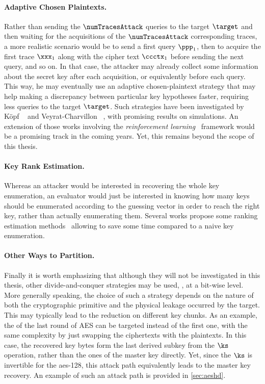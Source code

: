 \paragraph{Adaptive Chosen Plaintexts.}
Rather than sending the \(\numTracesAttack\) queries to the target \(\target\) and then waiting for the acquisitions of the \(\numTracesAttack\) corresponding traces, a more realistic scenario would be to send a first query \(\ppp_1\), then to acquire the first trace \(\xxx_1\) along with the cipher text \(\ccctx_1\) before sending the next query, and so on.
In that case, the attacker may already collect some information about the secret key after each acquisition, or equivalently before each query.
This way, he may eventually use an adaptive chosen-plaintext strategy that may help making a discrepancy between particular key hypotheses faster, \ie{} requiring less queries to the target \(\target\).
Such strategies have been investigated by Köpf \etal{}~\cite{kopf_information_2007,kopf_automatically_2011} and Veyrat-Charvillon \etal{}~\cite{veyrat_adaptive_2010}, with promising results on simulations.
An extension of those works involving the \emph{reinforcement learning}~\cite{sutton_reinforcement_1998} framework would be a promising track in the coming years.
Yet, this remains beyond the scope of this thesis.

\paragraph{Key Rank Estimation.}
Whereas an attacker would be interested in recovering the whole key enumeration, an evaluator would just be interested in knowing how many keys should be enumerated according to the guessing vector in order to reach the right key, rather than actually enumerating them.
Several works propose some ranking estimation methods~\cite{veyrat-charvillon_security_2013,ye_bounded_2014,glowacz_simpler_2015,martin_characterisation_2016,martin_two_2018,david_fast_2019,azouaoui_key_2019} allowing to save some time compared to a naive key enumeration.

\paragraph{Other Ways to Partition.}
Finally it is worth emphasizing that although they will not be investigated in this thesis, other divide-and-conquer strategies may be used, \eg{}, at a bit-wise level.
More generally speaking, the choice of such a strategy depends on the nature of both the cryptographic primitive and the physical leakage occurred by the target.
This may typically lead to the reduction on different key chunks.
As an example, the \ark{} of the last round of AES can be targeted instead of the first one, with the same complexity by just swapping the ciphertexts with the plaintexts.
In this case, the recovered key bytes form the last derived subkey from the \(\ks\) operation, rather than the ones of the master key directly.
Yet, since the \(\ks\) is invertible for the \gls{aes}-128, this attack path equivalently leads to the master key recovery.
An example of such an attack path is provided in \autoref{sec:aeshd}.